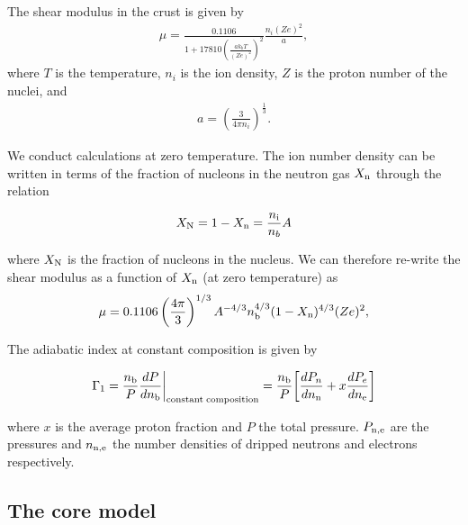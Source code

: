\documentclass[fleqn,usenatbib]{mnras}
\begin{document}

The shear modulus in the crust is given by 
\begin{align}
\mu=\frac{0.1106}{1+17810\left(\frac{ak_bT}{\left(Ze\right)^2}\right)^2}\frac{n_i\left(Ze\right)^2}{a},
\label{eq:mu_1991}
\end{align}
\noindent where $T$ is the temperature, $n_i$ is the ion density, $Z$ is the proton number of the nuclei, and 
\begin{align}
a=\left(\frac{3}{4\pi n_i}\right)^{\frac{1}{3}}.
\label{eq:mu_1991_a}
\end{align}

We conduct calculations at zero temperature. The ion number density can be written in terms of the fraction of nucleons in the neutron gas $X_{\rm n}$ through the relation \citep{Newton:2013aa}

\begin{equation}
    X_{\rm N} = 1 - X_{\rm n} = \frac{n_{\rm i}}{n_b}A
    \label{eq:neutrons_ions}
\end{equation}

\noindent where $X_{\rm N}$ is the fraction of nucleons in the nucleus. 
We can therefore re-write the shear modulus as a function of $X_{\rm n}$ (at zero temperature) as \citep{Steiner:2008aa,Newton:2011crustosc}
\begin{equation}
	\mu = 0.1106 \left(\frac{4\pi}{3}\right)^{1/3} A^{-4/3} n_{\rm b}^{4/3} (1-X_{\rm n})^{4/3} (Ze)^2,
	\label{eq:altmu}
\end{equation}

The adiabatic index at constant composition is given by

\begin{equation} \label{eq:adiabatic_index}
\Gamma_{\rm 1} = \frac{n_{\rm b}}{P} \frac{dP}{dn_{\rm b}}\bigg|_{\rm constant \; composition} =  \frac{n_{\rm b}}{P} \bigg[\frac{dP_n}{dn_{\rm n}} +  x \frac{dP_e}{dn_{\rm e}}  \bigg]
\end{equation}

\noindent where $x$ is the average proton fraction and $P$ the total pressure. $P_{\rm n,e}$ are the pressures and $n_{\rm n,e}$ the number densities of dripped neutrons and electrons respectively.


\subsection{The core model}
\end{document}
